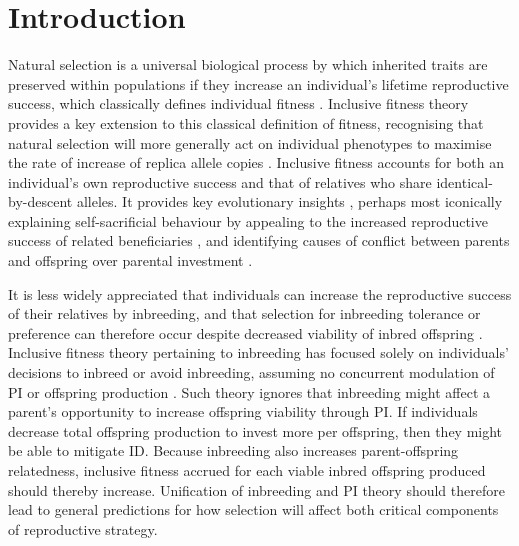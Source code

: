 \documentclass[10pt,letterpaper]{article}
\begin{document}


\section*{Introduction}
Natural selection is a universal biological process by which inherited traits are preserved within populations if they increase an individual's lifetime reproductive success, which classically defines individual fitness \cite[][]{Darwin1859, Dawkins1982}. Inclusive fitness theory \cite[][]{Hamilton1964, Hamilton1964a} provides a key extension to this classical definition of fitness, recognising that natural selection will more generally act on individual phenotypes to maximise the rate of increase of replica allele copies \cite[][]{Grafen2006}. Inclusive fitness accounts for both an individual's own reproductive success and that of relatives who share identical-by-descent alleles. It provides key evolutionary insights \cite[][]{Gardner2014}, perhaps most iconically explaining self-sacrificial behaviour by appealing to the increased reproductive success of related beneficiaries \cite[][]{Hamilton1964}, and identifying causes of conflict between parents and offspring over parental investment \cite[hereafter `PI';][]{Trivers1972, Trivers1974}. 

It is less widely appreciated that individuals can increase the reproductive success of their relatives by inbreeding, and that selection for inbreeding tolerance or preference can therefore occur despite decreased viability of inbred offspring \cite[i.e., ``inbreeding depression'', hereafter `ID';][]{Parker1979}. Inclusive fitness theory pertaining to inbreeding has focused solely on individuals' decisions to inbreed or avoid inbreeding, assuming no concurrent modulation of PI or offspring production \cite[e.g.,][]{Parker2006, Kokko2006, Duthie2015a}. Such theory ignores that inbreeding might affect a parent's opportunity to increase offspring viability through PI. If individuals decrease total offspring production to invest more per offspring, then they might be able to mitigate ID. Because inbreeding also increases parent-offspring relatedness, inclusive fitness accrued for each viable inbred offspring produced should thereby increase. Unification of inbreeding and PI theory should therefore lead to general predictions for how selection will affect both critical components of reproductive strategy.
\end{document}
